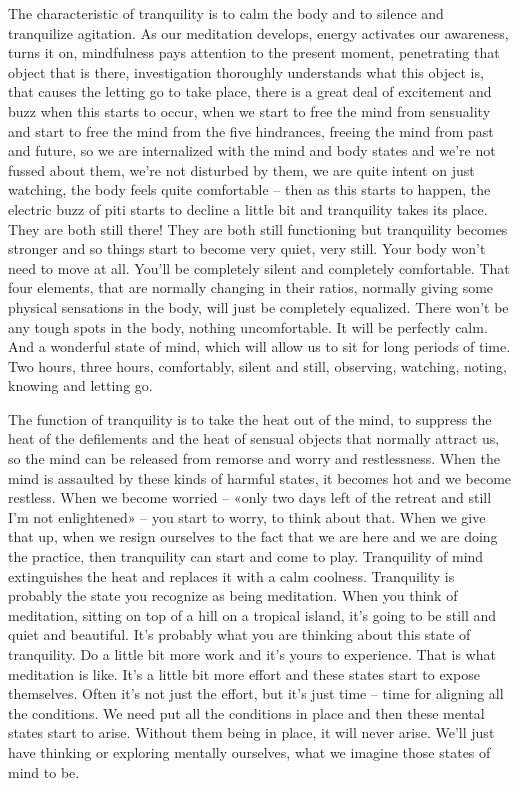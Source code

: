 \documentclass[letterpaper,10pt,english]{sphinxmanual}
\begin{document}
\sphinxAtStartPar
The  characteristic  of  tranquility  is  to  calm  the  body  and  to  silence
and tranquilize agitation. As our meditation develops, energy activates our
awareness,  turns  it  on,  mindfulness  pays  attention  to  the  present  moment,
penetrating  that  object  that  is  there,  investigation  thoroughly  understands
what this object is, that causes the letting go to take place, there is a great
deal of excitement and buzz when this starts to occur, when we start to free
the mind from sensuality and start to free the mind from the five hindrances,
freeing the mind from past and future, so we are internalized with the mind
and  body  states  and  we’re  not  fussed  about  them,  we’re  not  disturbed  by
them,  we  are  quite  intent  on  just  watching,  the  body  feels  quite  comfortable – then as this starts to happen, the electric buzz of piti starts to decline
a little bit and tranquility takes its place. They are both still there! They are
both still functioning but tranquility becomes stronger and so things start to
become very quiet, very still. Your body won’t need to move at all. You’ll be
completely silent and completely comfortable. That four elements, that are
normally changing in their ratios, normally giving some physical sensations
in  the  body,  will  just  be  completely  equalized.  There  won’t  be  any  tough
spots in the body, nothing uncomfortable. It will be perfectly calm. And a
wonderful state of mind, which will allow us to sit for long periods of time.
Two hours, three hours, comfortably, silent and still, observing, watching,
noting, knowing and letting go.

\sphinxAtStartPar
The function of tranquility is to take the heat out of the mind, to suppress  the  heat  of  the  defilements  and  the  heat  of  sensual  objects  that  normally attract us, so the mind can be released from remorse and worry and
restlessness. When the mind is assaulted by these kinds of harmful states, it
becomes hot and we become restless. When we become worried – «only two
  days left of the retreat and still I’m not enlightened» – you start to worry,
to think about that. When we give that up, when we resign ourselves to the
fact that we are here and we are doing the practice, then tranquility can start
and  come  to  play.  Tranquility  of  mind  extinguishes  the  heat  and  replaces
it with a calm coolness. Tranquility is probably the state you recognize as
being meditation. When you think of meditation, sitting on top of a hill on
a tropical island, it’s going to be still and quiet and beautiful. It’s probably
what you are thinking about this state of tranquility. Do a little bit more work
and it’s yours to experience. That is what meditation is like. It’s a little bit
more effort and these states start to expose themselves. Often it’s not just the
effort, but it’s just time – time for aligning all the conditions. We need put
all the conditions in place and then these mental states start to arise. Without
them being in place, it will never arise. We’ll just have thinking or exploring
mentally ourselves, what we imagine those states of mind to be.
\end{document}
